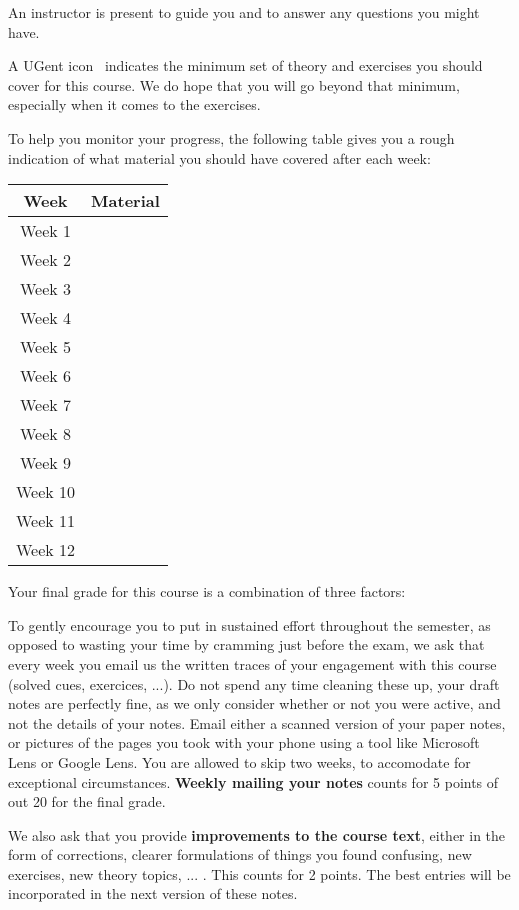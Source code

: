 An instructor is present to guide you and to answer any questions you might have.

A UGent icon \iconoffset\ugent\, indicates the minimum set of theory and exercises you should cover for this course. We do hope that you will go beyond that minimum, especially when it comes to the exercises.

To help you monitor your progress, the following table gives you a rough indication of what material you should have covered after each week:

\begin{center}
\begin{tabular}{ |c|c| } 
 \hline
  \textbf{Week} & \textbf{Material} \\
  \hline
 Week 1 &  \\ 
 Week 2 &  \\
 Week 3 &  \\
 Week 4 &  \\
 Week 5 &  \\
 Week 6 &  \\ 
 Week 7 &  \\
 Week 8 &  \\
 Week 9 &  \\
 Week 10 &  \\
 Week 11 &  \\ 
 Week 12 &  \\
 \hline
\end{tabular}
\end{center}

Your final grade for this course is a combination of three factors:

To gently encourage you to put in sustained effort throughout the semester, as opposed to wasting your time by cramming just before the exam, we ask that every week you email us the written traces of your engagement with this course (solved cues, exercices, ...). Do not spend any time cleaning these up, your draft notes are perfectly fine, as we only consider whether or not you were active, and not the details of your notes. Email either a scanned version of your paper notes, or pictures of the pages you took with your phone using a tool like Microsoft Lens or Google Lens. You are allowed to skip two weeks, to accomodate for exceptional circumstances. \textbf{Weekly mailing your notes} counts for 5 points of out 20 for the final grade.

We also ask that you provide \textbf{improvements to the course text}, either in the form of corrections, clearer formulations of things you found confusing, new exercises, new theory topics, ... . This counts for 2 points. The best entries will be incorporated in the next version of these notes.

